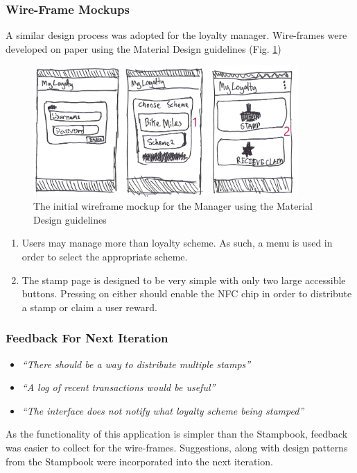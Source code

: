 \subsubsection{Wire-Frame Mockups}
A similar design process was adopted for the loyalty manager. Wire-frames were developed on paper using the Material Design guidelines (Fig. \ref{fig:wireframem1}) 
\begin{figure}[H]
 \centering
  \includegraphics[width=0.9\textwidth]{img/Page2.jpg}
    \caption{The initial wireframe mockup for the Manager using the Material Design guidelines}
         \label{fig:wireframem1}
\end{figure}


\begin{enumerate}
  \item Users may manage more than loyalty scheme. As such, a menu is used in order to select the appropriate scheme.
  \item The stamp page is designed to be very simple with only two large accessible buttons. Pressing on either should enable the NFC chip in order to distribute a stamp or claim a user reward.
\end{enumerate}

\subsubsection{Feedback For Next Iteration}
\begin{itemize}
  \item \textit{``There should be a way to distribute multiple stamps''}
  \item \textit{``A log of recent transactions would be useful''}
  \item \textit{``The interface does not notify what loyalty scheme being stamped''}
\end{itemize}

As the functionality of this application is simpler than the Stampbook, feedback was easier to collect for the wire-frames. Suggestions, along with design patterns from the Stampbook were incorporated into the next iteration.

